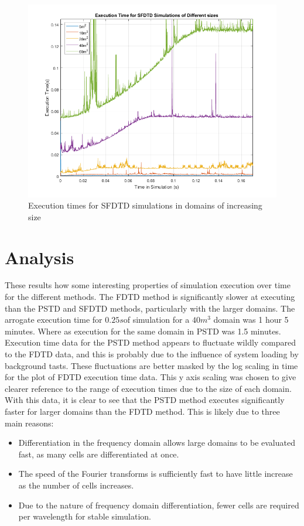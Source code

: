 \begin{figure}[H]
\centering
  \includegraphics[width=\textwidth]{./graphics/SFDTD simulation execution time.png}
  \caption{Execution times for SFDTD simulations in domains of increasing size}
\end{figure}

\section{Analysis}
These results how some interesting properties of simulation execution over time for the different methods. The FDTD method is significantly slower at executing than the PSTD and SFDTD methods, particularly with the larger domains. The arrogate execution time for $0.25s $of simulation for a $40m^3$ domain was 1 hour 5 minutes. Where as execution for the same domain in PSTD was 1.5 minutes. Execution time data for the PSTD method appears to fluctuate wildly compared to the FDTD data, and this is probably due to the influence of system loading by background tasts. These fluctuations are better masked by the log scaling in time for the plot of FDTD execution time data. This y axis scaling was chosen to give clearer reference to the range of execution times due to the size of each domain.\\

With this data, it is clear to see that the PSTD method executes significantly faster for larger domains than the FDTD method. This is likely due to three main reasons: \\
\begin{itemize}
\item Differentiation in the frequency domain allows large domains to be evaluated fast, as many cells are differentiated at once.
\item The speed of the Fourier transforms is sufficiently fast to have little increase as the number of cells increases. 
\item Due to the nature of frequency domain differentiation, fewer cells are required per wavelength for stable simulation.
\end{itemize}
